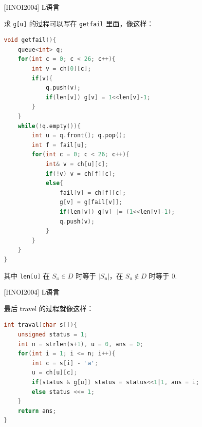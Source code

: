 \documentclass{beamer}
\begin{document}
\begin{frame}[fragile]{[HNOI2004] L语言}
    \footnotesize

    求 \verb|g[u]| 的过程可以写在 \verb|getfail| 里面，像这样：

    \begin{lstlisting}[language=c++]
void getfail(){
    queue<int> q;
    for(int c = 0; c < 26; c++){
        int v = ch[0][c];
        if(v){
            q.push(v);
            if(len[v]) g[v] = 1<<len[v]-1;
        }
    }
    while(!q.empty()){
        int u = q.front(); q.pop();
        int f = fail[u];
        for(int c = 0; c < 26; c++){
            int& v = ch[u][c];
            if(!v) v = ch[f][c];
            else{
                fail[v] = ch[f][c];
                g[v] = g[fail[v]];
                if(len[v]) g[v] |= (1<<len[v]-1);
                q.push(v);
            }
        }
    }
}
    \end{lstlisting}

    其中 \verb|len[u]| 在 $S_u\in D$ 时等于 $|S_u|$，在 $S_u\notin D$ 时等于 $0$.
\end{frame}

\begin{frame}[fragile]{[HNOI2004] L语言}
    \footnotesize

    最后 travel 的过程就像这样：

    \begin{lstlisting}[language=c++]
int traval(char s[]){
    unsigned status = 1;
    int n = strlen(s+1), u = 0, ans = 0;
    for(int i = 1; i <= n; i++){
        int c = s[i] - 'a';
        u = ch[u][c];
        if(status & g[u]) status = status<<1|1, ans = i;
        else status <<= 1;
    }
    return ans;
}
    \end{lstlisting}
\end{frame}
\end{document}
